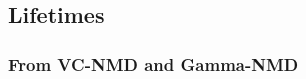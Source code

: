 
\subsection{\label{S:Phonon Lifetimes}Lifetimes}

\subsubsection{\label{S:From VC Gamma}From VC-NMD and Gamma-NMD}

